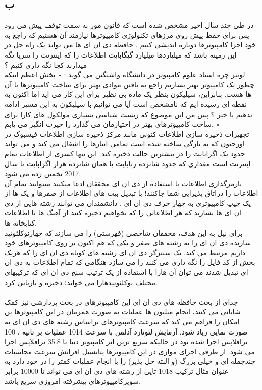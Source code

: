 \documentclass{article}
\begin{document}
\subsection{ب}
در طی چند سال اخیر مشخص شده است که قانون مور به سمت توقف پیش می رود پس برای حفظ پیش روی مرزهای تکنولوژی کامپیوترها نیازمند آن هستیم که راجع به خود اجزا کامپیوترها دوباره اندیشی کنیم . حافظه دی ان ای ها می تواند یک راه حل در این زمینه باشد که میلیاردها میلیارد گیگابایت اطلاعات را که اینترنت را سرپا نگه میدارند کجا نگه داری کنیم ؟
\\
لوئیز چزه استاد علوم کامپیوتر در دانشگاه واشنگتن می گوید : « بخش اعظم اینکه چطور یک کامپیوتر بهتر بسازیم راجع به یافتن موادی بهتر برای ساخت کامپیوترها با آن ها هست. بنابراین، سیلیکون بنظر یک ماده بی نظیر برای این کار می اید اما اکنون به نقطه ای رسیده ایم که نامشخص است آیا می توانیم با سیلیکون به این مسیر ادامه بدهیم یا خیر ؟ پس من این موضوع که زیست شناسی بسیاری مولکول های کارا برای ساخت کامپیوترهای بهتر در اختیارمان می گذارد را حیرت انگیز می یابم. »
\\
تجهیرات ذخیره سازی اطلاعات کنونی مانند مرکز ذخیره سازی اطلاعات فیسبوک در اورجئون که به تازگی ساخته شده است تمامی انبارها را اشغال می کند و می تواند حدود یک اگزابایت را در بیشترین حالت ذخیره کند. این تنها کسری از اطلاعات تمام اینترنت است مقداری که حدود 
شانزده زتابایت یا همان شانزده هزار اگزابایت تا سال 2017 تخمین زده می شود.
\\
بارمزگذاری اطلاعات با استفاده از دی ان ای محققان ادعا میکنند میتوانند تمام آن اطلاعات را دراتاق پذیرایی شما جاکنند! با تبدیل بیت های اطلاعات از صفرها و یک ها از یک چیپ کامپیوتری به چهار حرف دی ان ای . دانشمندان می توانند رشته هایی از دی ان ای ها بسازند که هر اطلاعاتی را که بخواهیم ذخیره کنند از آهنگ ها تا اطلاعات کتابخانه ها.
\\
برای نیل به این هدف، محققان شاخصی (فهرستی) را می سازند که چهارنوکلئوتید سازنده دی ان ای  را به رشته های صفر و یکی که هم اکنون بر روی کامپیوترهای خود داریم مرتبط می کند. یک سنتزگر دی ان ای رشته های کوتاه دی ان ای را که هریک بخش از کد فایل را نگه داری می کنند را می سازد هنگامی که تمام اطلاعات به دی ان ای تبدیل شدند می توان آن هارا با استفاده از یک ترتیب سنج دی ان ای که ترکیبهای مختلف نوکلئوتیدهارا می خواند؛ ذخیره و بازیابی کرد. \cite{discoverMag}
\\
\\
جدای از بحث حافظه های دی ان ای این کامپیوترهای در بحث پردازشی نیز کمک شایانی می کنند، انجام میلیون ها عملیات به صورت همزمان در این کامپیوترها ین امکان را فراهم می کند که سرعت کامپیوترهای براساس رشته های دی ان ای به صورت نمایی زیاد شود.  آزمایش لئونارد آدلمن با سرعت 1014 عملیات بر ثانیه ، 100 ترافلاپس اجرا شده بود در حالیکه سریع ترین ابر کامپیوتر دنیا با 35.8 ترافلاپس اجرا می شود. از طرفی اجرای موازی در این کامپیوترها پتانسیل افزایش سرعت محاسبات چندجمله ای و خیلی بزرگ (و البته حل پذیر) را با انجام عملیات کمتر را در خود دارد به عنوان مثال ترکیب 1018 تایی از رشته های دی ان ای می تواند تا 10000 برابر سوپرکامپیوترهای پیشرفته امروزی سریع باشد.\cite{stanfordEvaluation}
\\
\end{document}
